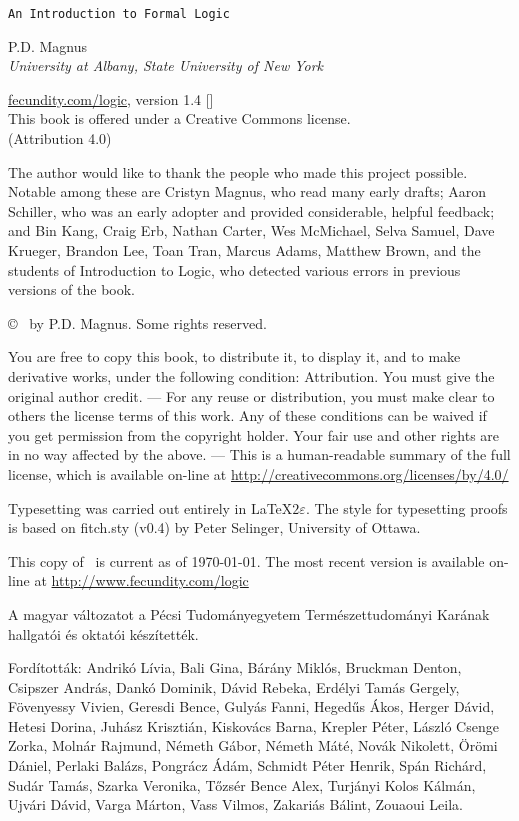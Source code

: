 \thispagestyle{empty}
{\Huge\forallx}

{\tt An Introduction to Formal Logic}

\vfill


{\sf P.D. Magnus}\\
\emph{University at Albany, State University of New York}


\vfill


{\sf
	\href{https://www.fecundity.com/logic/}{fecundity.com/logic}, version 1.4 [\bookversion]\\
	This book is offered under a Creative Commons license.\\
	(Attribution 4.0)
}



\newpage
\thispagestyle{empty}%
{\sf
The author would like to thank the people who made this project possible. Notable among these are Cristyn Magnus, who read many early drafts; Aaron Schiller, who was an early adopter and provided considerable, helpful feedback; {and} Bin Kang, Craig Erb, Nathan Carter, Wes McMichael, Selva Samuel,  Dave Krueger, Brandon Lee, Toan Tran, Marcus Adams, Matthew Brown, and the students of Introduction to Logic, who detected various errors in previous versions of the book.
}

\vfill
{
\copyright\  by P.D. Magnus. Some rights reserved.
}

{\footnotesize
You are free to copy this book, to distribute it, to display it, and to make derivative works, under the following condition: Attribution. You must give the original author credit. --- For any reuse or distribution, you must make clear to others the license terms of this work. Any of these conditions can be waived if you get permission from the copyright holder. Your fair use and other rights are in no way affected by the above. --- This is a human-readable summary of the full license, which is available on-line at \url{http://creativecommons.org/licenses/by/4.0/}
}

{
Typesetting was carried out entirely in \LaTeX$2\varepsilon$. The style for typesetting proofs is based on fitch.sty (v0.4) by Peter Selinger, University of Ottawa.

This copy of \forallx\ is current as of \today. The most recent version is available on-line at \url{http://www.fecundity.com/logic}
}

{
A magyar változatot a Pécsi Tudományegyetem Természettudományi Karának hallgatói és oktatói készítették.

Fordították: Andrikó Lívia, Bali Gina, Bárány Miklós, Bruckman Denton,
Csipszer András, Dankó Dominik, Dávid Rebeka, Erdélyi Tamás Gergely,
Fövenyessy Vivien, Geresdi Bence, Gulyás Fanni,
Hegedűs Ákos, Herger Dávid, Hetesi Dorina,
Juhász Krisztián, Kiskovács Barna, Krepler Péter,
László Csenge Zorka, Molnár Rajmund,
Németh Gábor, Németh Máté, Novák Nikolett,
Örömi Dániel, Perlaki Balázs, Pongrácz Ádám,
Schmidt Péter Henrik, Spán Richárd, Sudár Tamás, Szarka Veronika,
Tőzsér Bence Alex, Turjányi Kolos Kálmán, Ujvári Dávid,
Varga Márton, Vass Vilmos, Zakariás Bálint, Zouaoui Leila.
}